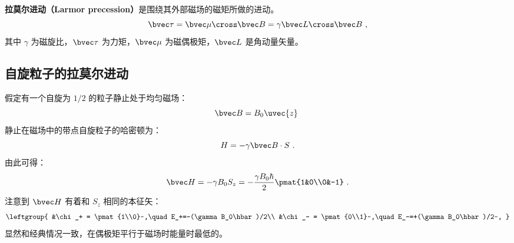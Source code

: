 
\textbf{拉莫尔进动（Larmor precession）}是围绕其外部磁场的磁矩所做的进动。
\begin{equation}
\bvec \tau = \bvec\mu\cross\bvec B=\gamma\bvec L\cross \bvec B~,
\end{equation}
其中 $\gamma$ 为磁旋比，$\bvec\tau$ 为力矩，$\bvec \mu$ 为磁偶极矩，$\bvec L$ 是角动量矢量。



\subsection{自旋粒子的拉莫尔进动}

假定有一个自旋为 $1/2$ 的粒子静止处于均匀磁场：
\begin{equation}
\bvec B =B_0\uvec{z}~
\end{equation}
静止在磁场中的带点自旋粒子的哈密顿为：
\begin{equation}
H = -\gamma\bvec B\cdot S~.
\end{equation}
由此可得：
\begin{equation}
\bvec H = -\gamma B_0S_z=-\frac{\gamma B_0\hbar}{2}\pmat{1&0\\0&-1}~.
\end{equation}
注意到 $\bvec H$ 有着和 $S_z$ 相同的本征矢：
\begin{equation}
\leftgroup{
&\chi_+ = \pmat{1\\0}~,\quad E_+=-(\gamma B_0\hbar)/2\\
&\chi_- = \pmat{0\\1}~,\quad E_-=+(\gamma B_0\hbar)/2~,
}\end{equation}
显然和经典情况一致，在偶极矩平行于磁场时能量时最低的。

